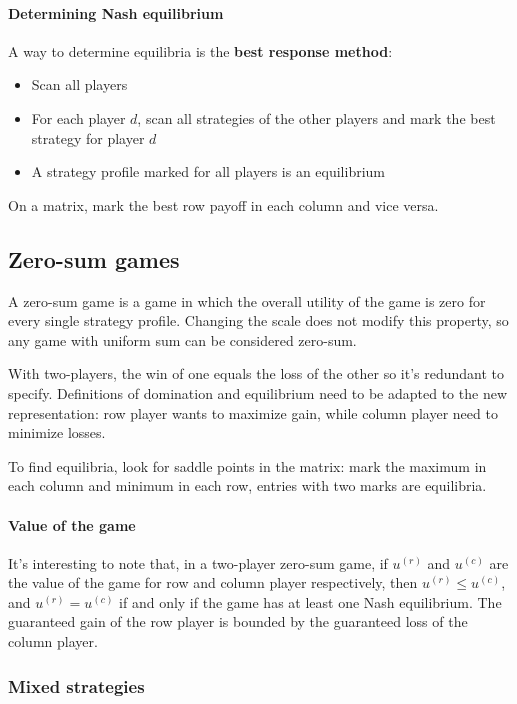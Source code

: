 \paragraph{Determining Nash equilibrium} A way to determine equilibria is the \textbf{best response method}: 
\begin{itemize}
	\item Scan all players
	
	\item For each player $d$, scan all strategies of the other players and mark the best strategy for player $d$
	
	\item A strategy profile marked for all players is an equilibrium
\end{itemize}

On a matrix, mark the best row payoff in each column and vice versa. 

\subsection{Zero-sum games}

A zero-sum game is a game in which the overall utility of the game is zero for every single strategy profile. Changing the scale does not modify this property, so any game with uniform sum can be considered zero-sum. 

With two-players, the win of one equals the loss of the other so it's redundant to specify. Definitions of domination and equilibrium need to be adapted to the new representation: row player wants to maximize gain, while column player need to minimize losses. 

To find equilibria, look for saddle points in the matrix: mark the maximum in each column and minimum in each row, entries with two marks are equilibria.

\paragraph{Value of the game} It's interesting to note that, in a two-player zero-sum game, if $u^{(r)}$ and $u^{(c)}$ are the value of the game for row and column player respectively, then $u^{(r)} \leq u^{(c)}$, and $u^{(r)} = u^{(c)}$ if and only if the game has at least one Nash equilibrium. The guaranteed gain of the row player is bounded by the guaranteed loss of the column player.

\subsubsection{Mixed strategies}

